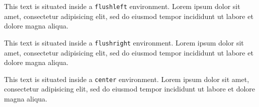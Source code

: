 \begin{flushleft} This text is situated inside a \texttt{flushleft} 
environment. Lorem ipsum dolor sit amet, consectetur adipisicing elit, sed do 
eiusmod tempor incididunt ut labore et dolore magna aliqua. \end{flushleft}

\begin{flushright} This text is situated inside a \texttt{flushright} 
environment. Lorem ipsum dolor sit amet, consectetur adipisicing elit, sed do 
eiusmod tempor incididunt ut labore et dolore magna aliqua. \end{flushright}

\begin{center} This text is situated inside a \texttt{center} environment. 
Lorem ipsum dolor sit amet, consectetur adipisicing elit, sed do eiusmod tempor 
incididunt ut labore et dolore magna aliqua. \end{center}
